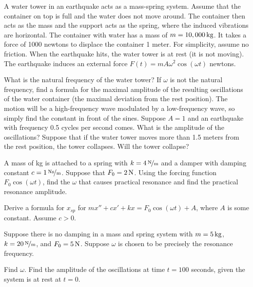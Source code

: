 \begin{exercise}
\pagebreak[3]
A water tower in an earthquake acts as a mass-spring system.
Assume that the container on top is full and the water does not move around.
The container then acts as the mass and the support acts as the spring, where
the induced vibrations are horizontal.  The container with water
has a mass of $m=\unit[10,000]{kg}$.  It takes a force of 1000 newtons
to displace the container 1 meter.  For simplicity, assume no friction.
When the earthquake hits, the water tower is at rest (it is not moving).
%
The earthquake induces an external force 
$F(t) = m A \omega^2 \cos (\omega t)$ newtons.
\begin{tasks}
\task
What is the natural frequency of the water tower?
\task
If $\omega$ is not the natural frequency, find a formula for the maximal
amplitude of the resulting oscillations of the water container (the maximal
deviation from the rest position).  The motion will be a high-frequency wave
modulated by a low-frequency wave, so simply find the constant in front of the
sines.
\task
Suppose $A = 1$ and an earthquake with frequency 0.5 cycles per second
comes.  What is the amplitude of the oscillations?  Suppose that if the water
tower moves more than 1.5 meters from the rest position, the tower collapses.
Will the tower collapse?
\end{tasks}
\end{exercise}


\setcounter{exercise}{100}

\begin{exercise}
A mass of \unit[4]{kg} is attached to a spring with $k=\unitfrac[4]{N}{m}$ and a
damper with damping
constant $c=\unitfrac[1]{Ns}{m}$.
Suppose that $F_0 = \unit[2]{N}$.
Using the forcing function $F_0 \cos (\omega t)$,
find the $\omega$ that causes practical resonance and find the
practical resonance amplitude.
\end{exercise}

\begin{exercise}
Derive a formula for $x_{sp}$ for
$mx''+cx'+kx = F_0 \cos(\omega t) + A$,
where $A$ is some constant.  Assume $c > 0$.
\end{exercise}

\begin{exercise}
Suppose there is no damping in a mass and spring system with
$m = \unit[5]{kg}$, $k= \unitfrac[20]{N}{m}$, and $F_0 = \unit[5]{N}$.  Suppose $\omega$ is chosen
to be precisely the resonance frequency.
\begin{tasks}
\task
Find $\omega$.
\task
Find the amplitude of the oscillations at time $t=100$ seconds, given the system is at
rest at $t=0$.
\end{tasks}
\end{exercise}
